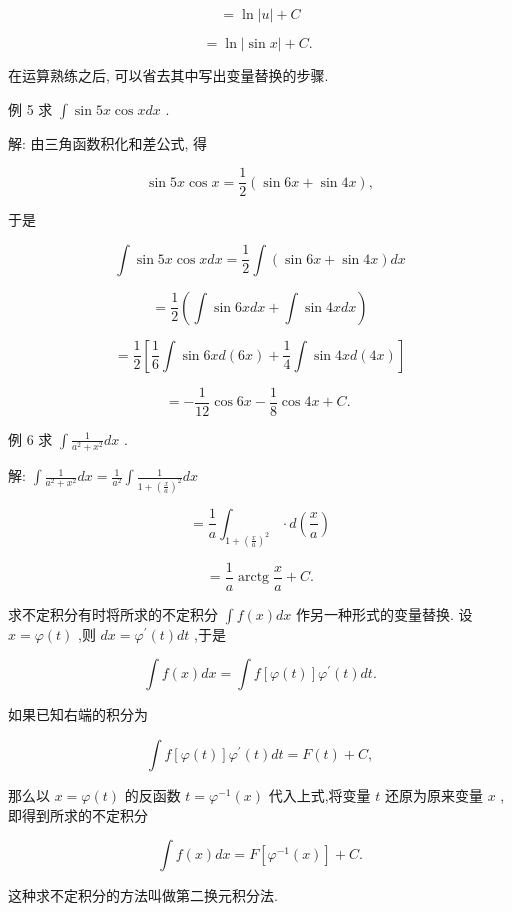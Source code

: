 \documentclass[lang=cn,newtx,10pt,scheme=chinese]{elegantbook}
\begin{document}
\[
= \ln \left| u\right| + C
\]

\[
= \ln \left| {\sin x}\right| + C\text{. }
\]

在运算熟练之后, 可以省去其中写出变量替换的步骤.

例 5 求 \(\int \sin {5x}\cos {xdx}\) .

解: 由三角函数积化和差公式, 得

\[
\sin {5x}\cos x = \frac{1}{2}\left( {\sin {6x} + \sin {4x}}\right) ,
\]

于是

\[
\int \sin {5x}\cos {xdx} = \frac{1}{2}\int \left( {\sin {6x} + \sin {4x}}\right) {dx}
\]

\[
= \frac{1}{2}\left( {\int \sin {6xdx}+\int \sin {4xdx}}\right)
\]

\[
= \frac{1}{2}\left\lbrack {\frac{1}{6}\int \sin {6xd}\left( {6x}\right) + \frac{1}{4}\int \sin {4xd}\left( {4x}\right) }\right\rbrack
\]

\[
= - \frac{1}{12}\cos {6x} - \frac{1}{8}\cos {4x} + C\text{. }
\]

例 6 求 \(\int \frac{1}{{a}^{2} + {x}^{2}}{dx}\) .

解: \(\int \frac{1}{{a}^{2} + {x}^{2}}{dx} = \frac{1}{{a}^{2}}\int \frac{1}{1 + {\left( \frac{x}{a}\right) }^{2}}{dx}\)

\[
= \frac{1}{a}{\int }_{1 + {\left( \frac{x}{a}\right) }^{2}} \cdot d\left( \frac{x}{a}\right)
\]

\[
= \frac{1}{a}\operatorname{arctg}\frac{x}{a} + C.
\]

求不定积分有时将所求的不定积分 \(\int f\left( x\right) {dx}\) 作另一种形式的变量替换. 设 \(x = \varphi \left( t\right)\) ,则 \({dx} = {\varphi }^{\prime }\left( t\right) {dt}\) ,于是

\[
\int f\left( x\right) {dx} = \int f\left\lbrack {\varphi \left( t\right) }\right\rbrack {\varphi }^{\prime }\left( t\right) {dt}.
\]

如果已知右端的积分为

\[
\int f\left\lbrack {\varphi \left( t\right) }\right\rbrack {\varphi }^{\prime }\left( t\right) {dt} = F\left( t\right) + C,
\]

那么以 \(x = \varphi \left( t\right)\) 的反函数 \(t = {\varphi }^{-1}\left( x\right)\) 代入上式,将变量 \(t\) 还原为原来变量 \(x\) ,即得到所求的不定积分

\[
\int f\left( x\right) {dx} = F\left\lbrack {{\varphi }^{-1}\left( x\right) }\right\rbrack + C.
\]

这种求不定积分的方法叫做第二换元积分法.
\end{document}
